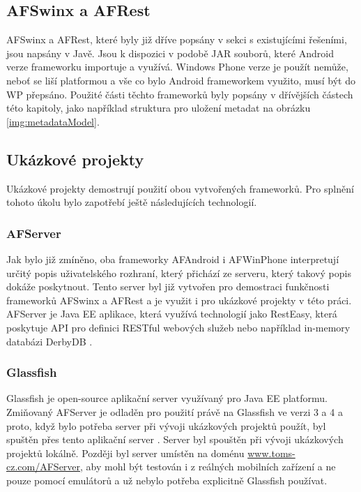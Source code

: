 \subsection{AFSwinx a AFRest}
AFSwinx a AFRest, které byly již dříve popsány v sekci s existujícími řešeními, jsou napsány v Javě. Jsou k dispozici v podobě JAR souborů, které Android verze frameworku importuje a využívá. Windows Phone verze je použít nemůže, neboť se liší platformou a vše co bylo Android frameworkem využito, musí být do WP přepsáno.
Použité části těchto frameworků byly popsány v dřívějších částech této kapitoly, jako například struktura pro uložení metadat na obrázku \ref{img:metadataModel}.

\subsection{Ukázkové projekty}  
Ukázkové projekty demostrují použití obou vytvořených frameworků. Pro splnění tohoto úkolu bylo zapotřebí ještě následujících technologií.
\subsubsection{AFServer}
Jak bylo již zmíněno, oba frameworky AFAndroid i AFWinPhone interpretují určitý popis uživatelského rozhraní, který přichází ze serveru, který takový popis dokáže poskytnout. Tento server byl již vytvořen pro demostraci funkčnosti frameworků AFSwinx a AFRest a je využit i pro ukázkové projekty v této práci. AFServer je Java EE aplikace, která využívá technologií jako RestEasy, která poskytuje API pro definici RESTful webových služeb nebo například in-memory databázi DerbyDB \cite{tomasek-thesis}. 
\subsubsection{Glassfish}
Glassfish \cite{glassfish} je open-source aplikační server využívaný pro Java EE platformu. Zmiňovaný AFServer je odladěn pro použití právě na Glassfish ve verzi 3 a 4 a proto, když bylo potřeba server při vývoji ukázkových projektů použít, byl spuštěn přes tento aplikační server \cite{tomasek-thesis}. Server byl spouštěn při vývoji ukázkových projektů lokálně. Později byl server umístěn na doménu \url{www.toms-cz.com/AFServer}, aby mohl být testován i z reálných mobilních zařízení a ne pouze pomocí emulátorů a už nebylo potřeba explicitně Glassfish používat.
